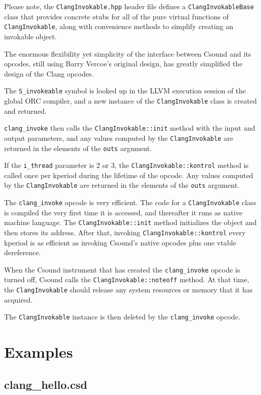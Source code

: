 \documentclass[letterpaper, 12pt]{article}
\begin{document}
Please note, the \verb|ClangInvokable.hpp| header file defines a \verb|ClangInvokableBase| class that provides concrete stubs for all of the pure virtual functions of \verb|ClangInvokable|, along with convenience methods to simplify creating an invokable object.

\noindent The enormous flexibility yet simplicity of the interface between Csound and its opcodes, still using Barry Vercoe's original design, has greatly simplified the design of the Clang opcodes.

The \verb|S_invokeable| symbol is looked up in the LLVM execution session 
of the global ORC compiler, and a new instance of the \verb|ClangInvokable| class 
is created and returned.

\verb|clang_invoke| then calls the \verb|ClangInvokable::init| method with 
the input and output parameters, and any values computed by the 
\verb|ClangInvokable| are returned in the elements of the \verb|outs| argument.

If the \verb|i_thread| parameter is 2 or 3, the \verb|ClangInvokable::kontrol| method is 
called once per kperiod during the lifetime of the opcode. Any values 
computed by the \verb|ClangInvokable| are returned in the elements of the \verb|outs| argument. 

The \verb|clang_invoke| opcode is very efficient. The code for a \verb|ClangInvokable| class is compiled the very first time it is accessed, and thereafter it runs as native machine language. The \verb|ClangInvokable::init| method initializes the object and then stores its address. After that, invoking \verb|ClangInvokable::kontrol| every kperiod is as efficient as invoking Csound's native opcodes plus one vtable dereference.

When the Csound instrument that has created the \verb|clang_invoke| opcode is 
turned off, Csound calls the \verb|ClangInvokable::noteoff| method. At that 
time, the \verb|ClangInvokable| should release any system resources or memory 
that it has acquired.

The \verb|ClangInvokable| instance is then deleted by the \verb|clang_invoke| opcode.

\section{Examples}

\subsection{clang\_hello.csd}
\end{document}
